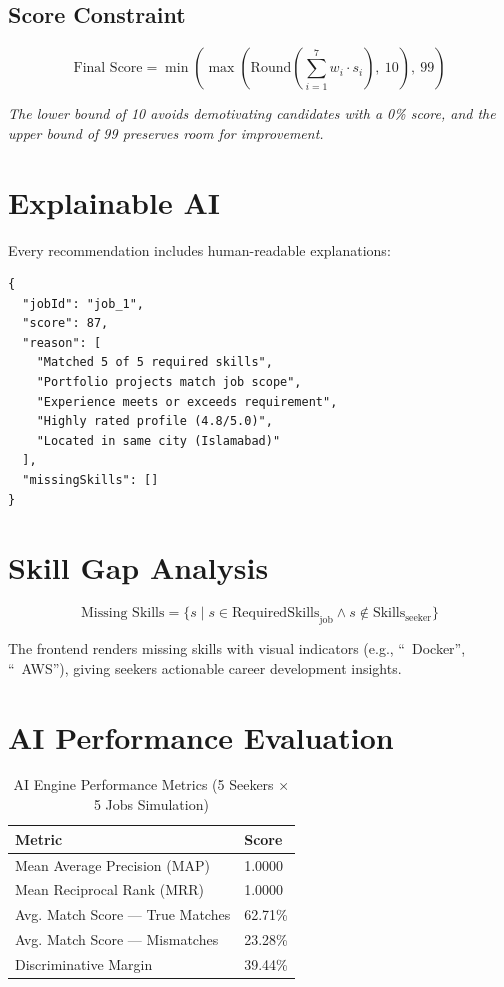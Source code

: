 \documentclass[12pt,a4paper,oneside]{report}
\begin{document}
\subsection{Score Constraint}

\begin{equation}
\text{Final Score} = \min\left(\max\left(\text{Round}\left(\sum_{i=1}^{7} w_i \cdot s_i\right),\ 10\right),\ 99\right)
\end{equation}

\textit{The lower bound of 10 avoids demotivating candidates with a 0\% score, and the upper bound of 99 preserves room for improvement.}

\section{Explainable AI}

Every recommendation includes human-readable explanations:

\begin{lstlisting}[caption=Sample AI Explanation Response]
{
  "jobId": "job_1",
  "score": 87,
  "reason": [
    "Matched 5 of 5 required skills",
    "Portfolio projects match job scope",
    "Experience meets or exceeds requirement",
    "Highly rated profile (4.8/5.0)",
    "Located in same city (Islamabad)"
  ],
  "missingSkills": []
}
\end{lstlisting}

\section{Skill Gap Analysis}

\begin{equation}
\text{Missing Skills} = \{s \mid s \in \text{RequiredSkills}_\text{job} \land s \notin \text{Skills}_\text{seeker}\}
\end{equation}

The frontend renders missing skills with visual indicators (e.g., ``\texttimes\ Docker'', ``\texttimes\ AWS''), giving seekers actionable career development insights.

\section{AI Performance Evaluation}

\begin{table}[H]
  \centering
  \caption{AI Engine Performance Metrics (5 Seekers × 5 Jobs Simulation)}
  \label{tab:ai-metrics}
  \begin{tabular}{ll}
    \toprule
    \textbf{Metric} & \textbf{Score} \\
    \midrule
    Mean Average Precision (MAP)       & 1.0000 \\
    Mean Reciprocal Rank (MRR)         & 1.0000 \\
    Avg. Match Score — True Matches    & 62.71\% \\
    Avg. Match Score — Mismatches      & 23.28\% \\
    Discriminative Margin              & 39.44\% \\
    \bottomrule
  \end{tabular}
\end{table}
\end{document}
